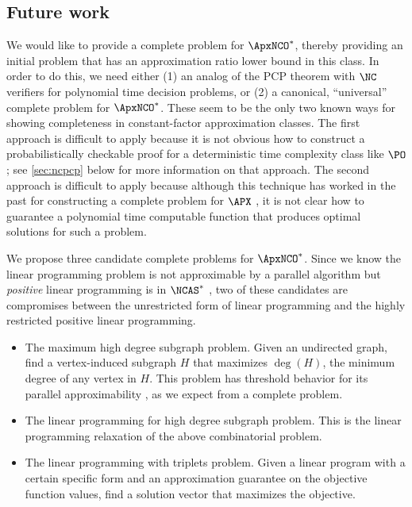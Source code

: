 \documentclass{article}
\begin{document}
\subsection{Future work}
\label{sec:fut}

We would like to provide a complete problem for $\ApxNCO^*$, thereby providing an initial problem that has an approximation ratio lower bound in this class.
In order to do this, we need either (1) an analog of the PCP theorem with $\NC$ verifiers for polynomial time decision problems, or (2) a canonical, ``universal'' complete problem for $\ApxNCO^*$.
These seem to be the only two known ways for showing completeness in constant-factor approximation classes.
The first approach is difficult to apply because it is not obvious how to construct a probabilistically checkable proof for a deterministic time complexity class like $\PO$; see \autoref{sec:ncpcp} below for more information on that approach.
The second approach is difficult to apply because although this technique has worked in the past for constructing a complete problem for $\APX$ \autocite[Lemma~2]{cp91}, it is not clear how to guarantee a polynomial time computable function that produces optimal solutions for such a problem.

We propose three candidate complete problems for $\ApxNCO^*$.
Since we know the linear programming problem is not approximable by a parallel algorithm but \emph{positive} linear programming is in $\NCAS^*$ \autocite{ln93}, two of these candidates are compromises between the unrestricted form of linear programming and the highly restricted positive linear programming.
\begin{itemize}
\item
  The maximum high degree subgraph problem.
  Given an undirected graph, find a vertex-induced subgraph $H$ that maximizes $\deg(H)$, the minimum degree of any vertex in $H$.
  This problem has threshold behavior for its parallel approximability \autocite{am84}, as we expect from a complete problem.
\item
  The linear programming for high degree subgraph problem.
  This is the linear programming relaxation of the above combinatorial problem.
\item
  The linear programming with triplets problem.
  Given a linear program with a certain specific form and an approximation guarantee on the objective function values, find a solution vector that maximizes the objective.
\end{itemize}
\end{document}
